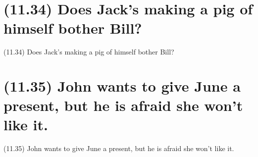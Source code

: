 \documentclass{article}
\begin{document}
\clearpage

%
%

\section*{(11.34) Does Jack's making a pig of himself bother Bill?}

\bigbreak
\begin{enumerate*}
\item[(11.34)] Does Jack's making a pig of himself bother Bill?
\end{enumerate*}
\bigbreak

\bigbreak
\begin{minipage}{\textwidth}
\end{minipage}
\bigbreak

\clearpage

%
%

\section*{(11.35) John wants to give June a present, but he is afraid she won’t like it.}

\bigbreak
\begin{enumerate*}
\item[(11.35)] John wants to give June a present, but he is afraid she won’t like it.
\end{enumerate*}
\bigbreak

\bigbreak
\begin{minipage}{\textwidth}
\end{minipage}
\bigbreak
\end{document}
